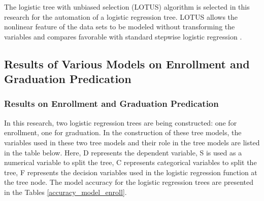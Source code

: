 \documentclass[12pt,english]{report}
\begin{document}
The logistic tree with unbiased selection (LOTUS) algorithm \citep{lotus2}  is selected in this research for the automation of a logistic regression tree. LOTUS allows the nonlinear feature of the data sets to be modeled without transforming the variables and compares favorable with standard stepwise logistic regression \citep{lotus_app1,lotus_app2}. %


\subsection{Results of Various Models on Enrollment and Graduation Predication}
\subsubsection{Results on Enrollment and Graduation Predication}

In this research, two logistic regression trees are being constructed: one for enrollment, one for graduation.  In the construction of these tree models, the variables used in these two tree models and their role in the tree models are listed in the table below. Here, D represents the dependent variable, S is used as a numerical variable to split the tree, C represents categorical variables to split the tree, F represents the decision variables used in the logistic regression function at the tree node.  The model accuracy for the logistic regression trees are presented in the Tables \ref{accuracy_model_enroll}. %
\end{document}
